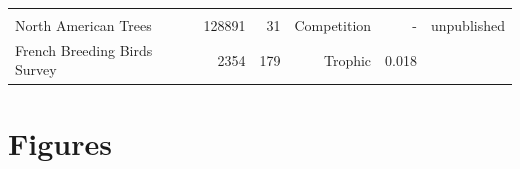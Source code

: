 \begin{longtable}[]{@{}lrrrrr@{}}
\begin{minipage}[t]{0.27\columnwidth}
\end{minipage}\tabularnewline
\begin{minipage}[t]{0.18\columnwidth}\raggedright\strut
North American Trees\strut
\end{minipage} & \begin{minipage}[t]{0.08\columnwidth}\raggedleft\strut
128891\strut
\end{minipage} & \begin{minipage}[t]{0.09\columnwidth}\raggedleft\strut
31\strut
\end{minipage} & \begin{minipage}[t]{0.13\columnwidth}\raggedleft\strut
Competition\strut
\end{minipage} & \begin{minipage}[t]{0.08\columnwidth}\raggedleft\strut
-\strut
\end{minipage} & \begin{minipage}[t]{0.27\columnwidth}\raggedleft\strut
unpublished\strut
\end{minipage}\tabularnewline
\begin{minipage}[t]{0.18\columnwidth}\raggedright\strut
French Breeding Birds Survey\strut
\end{minipage} & \begin{minipage}[t]{0.08\columnwidth}\raggedleft\strut
2354\strut
\end{minipage} & \begin{minipage}[t]{0.09\columnwidth}\raggedleft\strut
179\strut
\end{minipage} & \begin{minipage}[t]{0.13\columnwidth}\raggedleft\strut
Trophic\strut
\end{minipage} & \begin{minipage}[t]{0.08\columnwidth}\raggedleft\strut
0.018\strut
\end{minipage} & \begin{minipage}[t]{0.27\columnwidth}\raggedleft\strut
\citet{Gauzere2015}\strut
\end{minipage}\tabularnewline
\bottomrule
\end{longtable}

\section{Figures}\label{figures}

